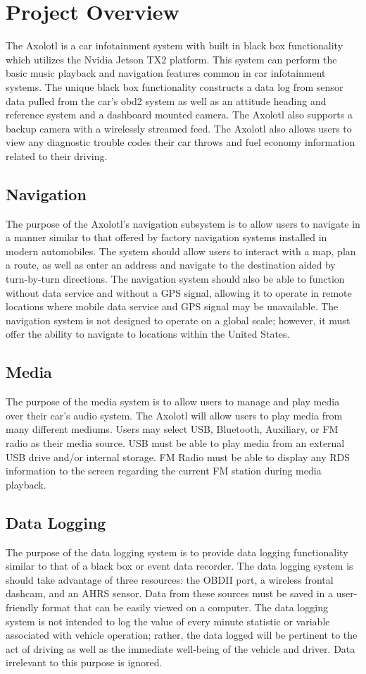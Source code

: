 \documentclass[onecolumn, draftclsnofoot, 10pt, compsoc]{IEEEtran}
\begin{document}
\section{Project Overview}
The Axolotl is a car infotainment system with built in black box functionality which utilizes the Nvidia Jetson TX2 platform. This system can perform the basic music playback and navigation features common in car infotainment systems. The unique black box functionality constructs a data log from sensor data pulled from the car's obd2 system as well as an attitude heading and reference system and a dashboard mounted camera. The Axolotl also supports a backup camera with a wirelessly streamed feed. The Axolotl also allows users to view any diagnostic trouble codes their car throws and fuel economy information related to their driving.

\subsection{Navigation}
The purpose of the Axolotl's navigation subsystem is to allow users to navigate in a manner similar to that offered by factory navigation systems installed in modern automobiles. The system should allow users to interact with a map, plan a route, as well as enter an address and navigate to the destination aided by turn-by-turn directions. The navigation system should also be able to function without data service and without a GPS signal, allowing it to operate in remote locations where mobile data service and GPS signal may be unavailable. The navigation system is not designed to operate on a global scale; however, it must offer the ability to navigate to locations within the United States.

\subsection{Media}
The purpose of the media system is to allow users to manage and play media over their car's audio system. The Axolotl will allow users to play media from many different mediums. Users may select USB, Bluetooth, Auxiliary, or FM radio as their media source. USB must be able to play media from an external USB drive and/or internal storage. FM Radio must be able to display any RDS information to the screen regarding the current FM station during media playback.

\subsection{Data Logging}
The purpose of the data logging system is to provide data logging functionality similar to that of a black box or event data recorder. The data logging system is should take advantage of three resources: the OBDII port, a wireless frontal dashcam, and an AHRS sensor. Data from these sources must be saved in a user-friendly format that can be easily viewed on a computer. The data logging system is not intended to log the value of every minute statistic or variable associated with vehicle operation; rather, the data logged will be pertinent to the act of driving as well as the immediate well-being of the vehicle and driver. Data irrelevant to this purpose is ignored.
\end{document}
